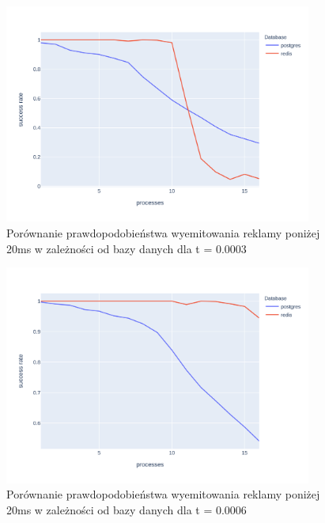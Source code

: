 \documentclass[polish, 10pt]{article}
\begin{document}
\begin{figure}[H]
    \centering
    \includegraphics[width=0.9\textwidth]{./graphs/success_rate_postgres_vs_redis_0003.png}
    \caption{Porównanie prawdopodobieństwa wyemitowania reklamy poniżej 20ms w zależności od bazy danych dla t = 0.0003}
\end{figure}

\begin{figure}[H]
    \centering
    \includegraphics[width=0.9\textwidth]{./graphs/success_rate_postgres_vs_redis_0006.png}
    \caption{Porównanie prawdopodobieństwa wyemitowania reklamy poniżej 20ms w zależności od bazy danych dla t = 0.0006}
\end{figure}
\end{document}
